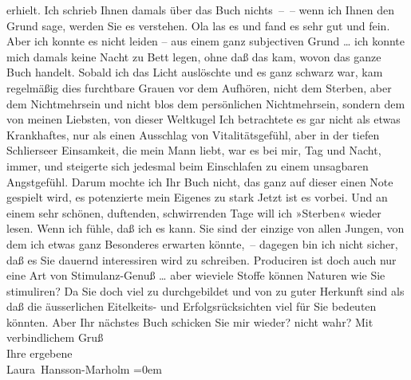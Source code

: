 \begin{ledgroupsized}[t]{13cm}
               erhielt. Ich schrieb Ihnen damals über das Buch nichts – – wenn ich Ihnen den Grund
               sage, werden Sie es verstehen. Ola las es und
               fand es sehr gut und fein.\pend
           \pstart
           Aber ich konnte es nicht leiden – aus einem ganz subjectiven Grund {\dots} ich konnte mich damals keine Nacht zu Bett legen, ohne
               daß das kam, wovon das ganze Buch handelt. Sobald ich das Licht auslöschte und es
               ganz schwarz war, kam regelmäßig dies furchtbare Grauen vor dem Aufhören, nicht dem
               Sterben, aber dem Nichtmehrsein und nicht blos dem persönlichen Nichtmehrsein,
               sondern dem von meinen Liebsten, von dieser Weltkugel{\dotsfour} Ich
               betrachtete es gar nicht als etwas Krankhaftes, nur als einen Ausschlag von
               Vitalitätsgefühl, aber in der tiefen Schlierseer
               Einsamkeit, die mein Mann
               liebt, war es bei mir, Tag und Nacht, immer, und steigerte sich jedesmal beim
               Einschlafen zu einem unsagbaren Angstgefühl. Darum mochte ich Ihr Buch nicht, das ganz auf dieser einen Note
               gespielt wird, es potenzierte mein Eigenes zu stark{\dotsfour}\pend
           \pstart
           Jetzt ist es vorbei. Und an einem sehr schönen, duftenden, schwirrenden Tage will ich
                  »Sterben« wieder lesen. Wenn ich fühle, daß
                  {\pb}ich es kann.\pend
           \pstart
           Sie sind der einzige von allen Jungen, von dem ich etwas ganz Besonderes erwarten
               könnte, – dagegen bin ich nicht sicher, daß es Sie dauernd interessiren wird zu
               schreiben. Produciren ist doch auch nur eine Art von Stimulanz-Genuß {\dots} aber wieviele Stoffe können Naturen wie Sie stimuliren?
               Da Sie doch viel zu durchgebildet und von zu guter Herkunft sind als daß die
               äusserlichen Eitelkeits- und Erfolgsrücksichten viel für Sie bedeuten könnten.\pend
           \pstart
           Aber Ihr nächstes Buch schicken Sie mir wieder? nicht wahr?\pend
           \pstart
           Mit verbindlichem Gruß{\\[\baselineskip]} Ihre ergebene{\\[\baselineskip]}\spacefill\mbox{Laura Hansson-Marholm}\pend
           \leftskip=0em{}
         
         \endnumbering{}\end{ledgroupsized}  \newcommand{\dateiname}{L00431}\newcommand{\titel}{Laura Marholm an Arthur Schnitzler, 24. 4. 1895}\newcommand{\editorInnen}{Martin Anton Müller und Gerd-Hermann Susen}
      
